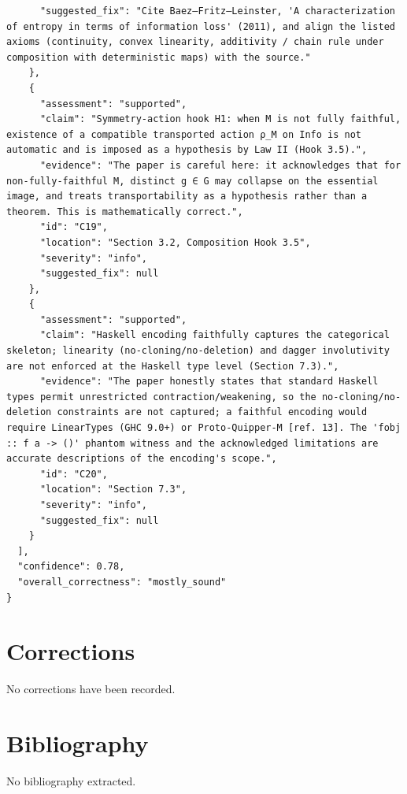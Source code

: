 \documentclass[11pt]{article}
\begin{document}
\begin{verbatim}
      "suggested_fix": "Cite Baez–Fritz–Leinster, 'A characterization of entropy in terms of information loss' (2011), and align the listed axioms (continuity, convex linearity, additivity / chain rule under composition with deterministic maps) with the source."
    },
    {
      "assessment": "supported",
      "claim": "Symmetry-action hook H1: when M is not fully faithful, existence of a compatible transported action ρ_M on Info is not automatic and is imposed as a hypothesis by Law II (Hook 3.5).",
      "evidence": "The paper is careful here: it acknowledges that for non-fully-faithful M, distinct g ∈ G may collapse on the essential image, and treats transportability as a hypothesis rather than a theorem. This is mathematically correct.",
      "id": "C19",
      "location": "Section 3.2, Composition Hook 3.5",
      "severity": "info",
      "suggested_fix": null
    },
    {
      "assessment": "supported",
      "claim": "Haskell encoding faithfully captures the categorical skeleton; linearity (no-cloning/no-deletion) and dagger involutivity are not enforced at the Haskell type level (Section 7.3).",
      "evidence": "The paper honestly states that standard Haskell types permit unrestricted contraction/weakening, so the no-cloning/no-deletion constraints are not captured; a faithful encoding would require LinearTypes (GHC 9.0+) or Proto-Quipper-M [ref. 13]. The 'fobj :: f a -> ()' phantom witness and the acknowledged limitations are accurate descriptions of the encoding's scope.",
      "id": "C20",
      "location": "Section 7.3",
      "severity": "info",
      "suggested_fix": null
    }
  ],
  "confidence": 0.78,
  "overall_correctness": "mostly_sound"
}
\end{verbatim}

\section*{Corrections}
No corrections have been recorded.

\section*{Bibliography}
No bibliography extracted.

% 
% 
\end{document}
